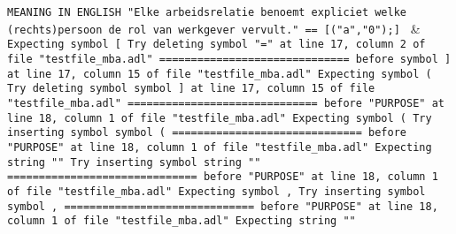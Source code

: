 \texttt{MEANING IN ENGLISH "Elke arbeidsrelatie benoemt expliciet welke (rechts)persoon de rol van werkgever vervult."\newline
  == [("a","0");]     } & \texttt{Expecting symbol [\newline
  Try deleting symbol "=" at line 17, column 2 of file "testfile\_mba.adl"\newline
  \newline
  ==============================\newline
  \newline
  before symbol ] at line 17, column 15 of file "testfile\_mba.adl"\newline
  Expecting symbol (\newline
  Try deleting symbol symbol ] at line 17, column 15 of file "testfile\_mba.adl"\newline
  \newline
  ==============================\newline
  \newline
  before "PURPOSE" at line 18, column 1 of file "testfile\_mba.adl"\newline
  Expecting symbol (\newline
  Try inserting symbol symbol (\newline
  \newline
  ==============================\newline
  \newline
  before "PURPOSE" at line 18, column 1 of file "testfile\_mba.adl"\newline
  Expecting string ""\newline
  Try inserting symbol string ""\newline
  \newline
  ==============================\newline
  \newline
  before "PURPOSE" at line 18, column 1 of file "testfile\_mba.adl"\newline
  Expecting symbol ,\newline
  Try inserting symbol symbol ,\newline
  \newline
  ==============================\newline
  \newline
  before "PURPOSE" at line 18, column 1 of file "testfile\_mba.adl"\newline
  Expecting string ""\newline
}
